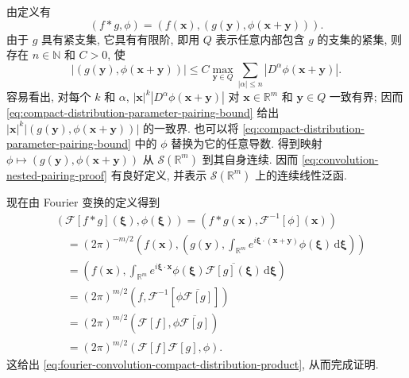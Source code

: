\begin{Proof}
由定义有
\begin{equation}\label{eq:convolution-nested-pairing-proof}
(f*g,\phi)=(f(\bm{x}),(g(\bm{y}),\phi(\bm{x}+\bm{y}))).
\end{equation}
由于 $g$ 具有紧支集, 它具有有限阶, 即用 $Q$ 表示任意内部包含 $g$ 的支集的紧集, 则存在 $n\in\mathbb{N}$ 和 $C>0$, 使
\begin{equation}\label{eq:compact-distribution-parameter-pairing-bound}
|(g(\bm{y}),\phi(\bm{x}+\bm{y}))|\leq C\max_{\bm{y}\in Q}\sum_{|\alpha|\leq n}|D^\alpha\phi(\bm{x}+\bm{y})|.
\end{equation}
容易看出, 对每个 $k$ 和 $\alpha$, $|\bm{x}|^k|D^\alpha\phi(\bm{x}+\bm{y})|$ 对 $\bm{x}\in\mathbb{R}^m$ 和 $\bm{y}\in Q$ 一致有界; 因而 \eqref{eq:compact-distribution-parameter-pairing-bound} 给出 $|\bm{x}|^k|(g(\bm{y}),\phi(\bm{x}+\bm{y}))|$ 的一致界. 也可以将 \eqref{eq:compact-distribution-parameter-pairing-bound} 中的 $\phi$ 替换为它的任意导数. 得到映射 $\phi\mapsto(g(\bm{y}),\phi(\bm{x}+\bm{y}))$ 从 $\mathcal{S}(\mathbb{R}^m)$ 到其自身连续. 因而 \eqref{eq:convolution-nested-pairing-proof} 有良好定义, 并表示 $\mathcal{S}(\mathbb{R}^m)$ 上的连续线性泛函.

现在由 Fourier 变换的定义得到
\begin{equation}\label{eq:fourier-convolution-compact-distribution-proof}
\begin{aligned}
&(\mathcal{F}[f*g](\bm{\xi}),\phi(\bm{\xi}))=(f*g(\bm{x}),\mathcal{F}^{-1}[\phi](\bm{x}))\\
&\quad=(2\pi)^{-m/2}\left(f(\bm{x}),\left(g(\bm{y}),\int_{\mathbb{R}^m}e^{i\bm{\xi}\cdot(\bm{x}+\bm{y})}\phi(\bm{\xi})\,\mathrm{d}\bm{\xi}\right)\right)\\
&\quad=\left(f(\bm{x}),\int_{\mathbb{R}^m}e^{i\bm{\xi}\cdot\bm{x}}\phi(\bm{\xi})\overline{\mathcal{F}[g](\bm{\xi})}\,\mathrm{d}\bm{\xi}\right)\\
&\quad=(2\pi)^{m/2}(f,\mathcal{F}^{-1}[\phi\overline{\mathcal{F}[g]}])\\
&\quad=(2\pi)^{m/2}(\mathcal{F}[f],\phi\overline{\mathcal{F}[g]})\\
&\quad=(2\pi)^{m/2}(\mathcal{F}[f]\mathcal{F}[g],\phi).
\end{aligned}
\end{equation}
这给出 \eqref{eq:fourier-convolution-compact-distribution-product}, 从而完成证明.
\end{Proof}
